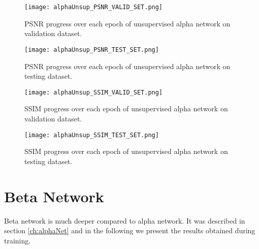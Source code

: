 \begin{figure}[!htb] 
\centering 
\texttt{[image: alphaUnsup\_PSNR\_VALID\_SET.png]} 
\caption[PSNR validation progress during training of unsupervised alpha network]{PSNR progress over each epoch of unsupervised alpha network on validation dataset.}
\label{fig:alphaUnsupValidPSNR} 
\end{figure}  

\begin{figure}[!htb]
\centering 
\texttt{[image: alphaUnsup\_PSNR\_TEST\_SET.png]} 
\caption[PSNR testing progress during training of unsupervised alpha network]{PSNR progress over each epoch of unsupervised alpha network on testing dataset.}
\label{fig:alphaUnsupTestPSNR} 
\end{figure}  

\begin{figure}[!htb]
\centering 
\texttt{[image: alphaUnsup\_SSIM\_VALID\_SET.png]} 
\caption[SSIM validation progress during training of unsupervised alpha network]{SSIM progress over each epoch of unsupervised alpha network on validation dataset.}
\label{fig:alphaUnsupValidSSIM} 
\end{figure}  

\begin{figure}[!htb] 
\centering 
\texttt{[image: alphaUnsup\_SSIM\_TEST\_SET.png]} 
\caption[SSIM testing progress during training of unsupervised alpha network]{SSIM progress over each epoch of unsupervised alpha network on testing dataset.}
\label{fig:alphaUnsupTestSSIM}
\end{figure}  



\FloatBarrier


\section{Beta Network}
Beta network is much deeper compared to alpha network. It was described in section \ref{ch:alphaNet} and in the following we present the results obtained during training.

